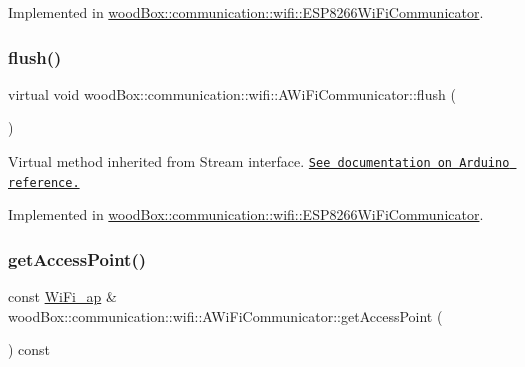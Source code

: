 Implemented in \mbox{\hyperlink{classwood_box_1_1communication_1_1wifi_1_1_e_s_p8266_wi_fi_communicator_a5a407734df1ae47ac32575fa6346cfd4}{wood\+Box\+::communication\+::wifi\+::\+E\+S\+P8266\+Wi\+Fi\+Communicator}}.

\mbox{\label{classwood_box_1_1communication_1_1wifi_1_1_a_wi_fi_communicator_a1c74b8bc27a89604b4b7daa94c0168a6}} 
\subsubsection{\texorpdfstring{flush()}{flush()}}
{\footnotesize\ttfamily virtual void wood\+Box\+::communication\+::wifi\+::\+A\+Wi\+Fi\+Communicator\+::flush (\begin{DoxyParamCaption}{ }\end{DoxyParamCaption})\hspace{0.3cm}{\ttfamily [pure virtual]}}

Virtual method inherited from Stream interface. \href{https://www.arduino.cc/reference/en/language/functions/communication/stream/streamflush/}{\tt See documentation on Arduino reference.} 

Implemented in \mbox{\hyperlink{classwood_box_1_1communication_1_1wifi_1_1_e_s_p8266_wi_fi_communicator_a523aec958ef48fa917621a560d964f40}{wood\+Box\+::communication\+::wifi\+::\+E\+S\+P8266\+Wi\+Fi\+Communicator}}.

\mbox{\label{classwood_box_1_1communication_1_1wifi_1_1_a_wi_fi_communicator_abda6749593511b1acc44a999734b9bd6}} 
\subsubsection{\texorpdfstring{get\+Access\+Point()}{getAccessPoint()}}
{\footnotesize\ttfamily const \mbox{\hyperlink{structwood_box_1_1communication_1_1wifi_1_1s__wifi__access__point}{Wi\+Fi\+\_\+ap}} \& wood\+Box\+::communication\+::wifi\+::\+A\+Wi\+Fi\+Communicator\+::get\+Access\+Point (\begin{DoxyParamCaption}{ }\end{DoxyParamCaption}) const}

